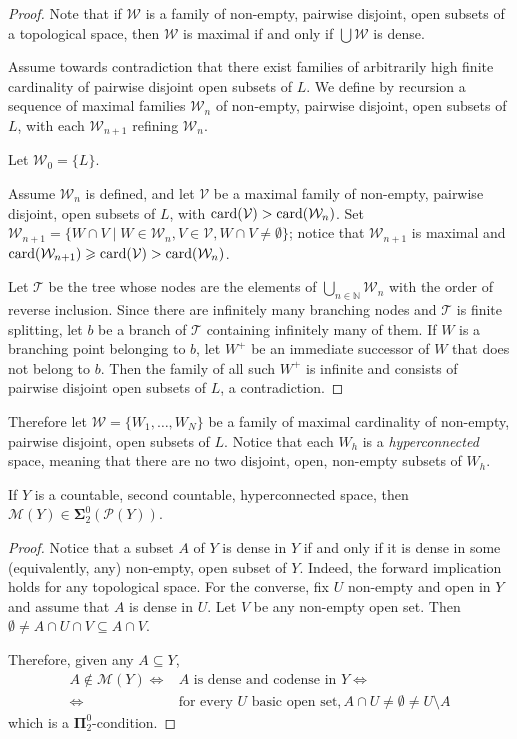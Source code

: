 \documentclass{lmcs}
\newcommand{\N}{\mathbb N}
\newcommand{\bsigma}{\boldsymbol\Sigma}
\newcommand{\bpi}{\boldsymbol\Pi}
\newcommand{\card}{{\rm{card}}}
\begin{document}
\begin{proof}
Note that if $ \mathcal W $ is a family of non-empty, pairwise disjoint, open subsets of a topological space, then $ \mathcal W $ is maximal if and only if $\bigcup \mathcal W $ is dense.

Assume towards contradiction that there exist families of arbitrarily high finite cardinality of pairwise disjoint open subsets of $L$.
We define by recursion a sequence of maximal families $ \mathcal W_n$ of non-empty, pairwise disjoint, open subsets of $L$, with each $ \mathcal W_{n+1}$ refining $ \mathcal W_n$.

Let $ \mathcal W_0=\{ L\} $.

Assume $ \mathcal W_n$ is defined, and let $ \mathcal V $ be a maximal family of non-empty, pairwise disjoint, open subsets of $L$, with $ \card ( \mathcal V)> \card ( \mathcal W_n)$.
Set $ \mathcal W_{n+1}=\{ W\cap V\mid W\in \mathcal W_n,V\in \mathcal V ,W\cap V\ne\emptyset\} $; notice that $ \mathcal W_{n+1}$ is maximal and $ \card ( \mathcal W_{n+1})\geqslant \card ( \mathcal V )> \card ( \mathcal W_n)$.

Let $ \mathcal T $ be the tree whose nodes are the elements of $\bigcup_{n\in \N } \mathcal W_n$ with the order of reverse inclusion.
Since there are infinitely many branching nodes and $ \mathcal T $ is finite splitting, let $b$ be a branch of $ \mathcal T $ containing infinitely many of them.
If $W$ is a branching point belonging to $b$, let $W^+$ be an immediate successor of $W$ that does not belong to $b$.
Then the family of all such $W^+$ is infinite and consists of pairwise disjoint open subsets of $L$, a contradiction.
\end{proof}

Therefore let $ \mathcal W =\{ W_1,\ldots ,W_N\} $ be a family of maximal cardinality of non-empty, pairwise disjoint, open subsets of $L$.
Notice that each $W_h$ is a \emph{hyperconnected} space, meaning that there are no two disjoint, open, non-empty subsets of $W_h$.

\begin{lem} \label{lem:newcorr}
If $Y$ is a countable, second countable, hyperconnected space, then $ \mathcal M (Y)\in \bsigma^0_2( \mathcal P (Y))$.
\end{lem}

\begin{proof}
Notice that a subset $A$ of $Y$ is dense in $Y$ if and only if it is dense in some (equivalently, any) non-empty, open subset of $Y$.
Indeed, the forward implication holds for any topological space.
For the converse, fix $U$ non-empty and open in $Y$ and assume that $A$ is dense in $U$.
Let $V$ be any non-empty open set.
Then $\emptyset\ne A\cap U\cap V\subseteq A\cap V$.

Therefore, given any $A\subseteq Y$,
\begin{align*}
A\notin \mathcal M (Y)\Leftrightarrow & A \text{ is dense and codense in } Y\Leftrightarrow \\
\Leftrightarrow & \text{for every } U \text{ basic open set},A\cap U\ne\emptyset\ne U\setminus A
\end{align*}
which is a $ \bpi^0_2$-condition.
\end{proof}
\end{document}
